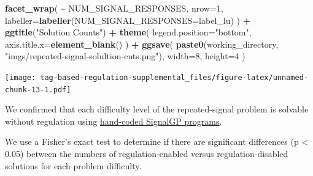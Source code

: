 \documentclass[
]{book}
\newenvironment{Shaded}{\begin{snugshade}}{\end{snugshade}}
\newcommand{\DataTypeTok}[1]{\textcolor[rgb]{0.13,0.29,0.53}{#1}}
\newcommand{\DecValTok}[1]{\textcolor[rgb]{0.00,0.00,0.81}{#1}}
\newcommand{\KeywordTok}[1]{\textcolor[rgb]{0.13,0.29,0.53}{\textbf{#1}}}
\newcommand{\NormalTok}[1]{#1}
\newcommand{\OperatorTok}[1]{\textcolor[rgb]{0.81,0.36,0.00}{\textbf{#1}}}
\newcommand{\StringTok}[1]{\textcolor[rgb]{0.31,0.60,0.02}{#1}}
\begin{document}
\begin{Shaded}
\begin{Highlighting}[]
\StringTok{  }\KeywordTok{facet\_wrap}\NormalTok{(}
    \OperatorTok{\textasciitilde{}}\StringTok{ }\NormalTok{NUM\_SIGNAL\_RESPONSES,}
    \DataTypeTok{nrow=}\DecValTok{1}\NormalTok{,}
    \DataTypeTok{labeller=}\KeywordTok{labeller}\NormalTok{(}\DataTypeTok{NUM\_SIGNAL\_RESPONSES=}\NormalTok{label\_lu)}
\NormalTok{  ) }\OperatorTok{+}
\StringTok{  }\KeywordTok{ggtitle}\NormalTok{(}\StringTok{"Solution Counts"}\NormalTok{) }\OperatorTok{+}
\StringTok{  }\KeywordTok{theme}\NormalTok{(}
    \DataTypeTok{legend.position=}\StringTok{"bottom"}\NormalTok{,}
    \DataTypeTok{axis.title.x=}\KeywordTok{element\_blank}\NormalTok{()}
\NormalTok{  ) }\OperatorTok{+}
\StringTok{  }\KeywordTok{ggsave}\NormalTok{(}
    \KeywordTok{paste0}\NormalTok{(working\_directory, }\StringTok{"imgs/repeated{-}signal{-}solultion{-}cnts.png"}\NormalTok{),}
    \DataTypeTok{width=}\DecValTok{8}\NormalTok{,}
    \DataTypeTok{height=}\DecValTok{4}
\NormalTok{  )}
\end{Highlighting}
\end{Shaded}

\texttt{[image: tag-based-regulation-supplemental\_files/figure-latex/unnamed-chunk-13-1.pdf]}

We confirmed that each difficulty level of the repeated-signal problem is solvable without regulation using \href{https://github.com/amlalejini/Tag-based-Genetic-Regulation-for-LinearGP/blob/master/documents/handcoded-examples.md}{hand-coded SignalGP programs}.

We use a Fisher's exact test to determine if there are significant differences (p \textless{} 0.05) between the numbers of regulation-enabled versus regulation-disabled solutions for each problem difficulty.
\end{document}
